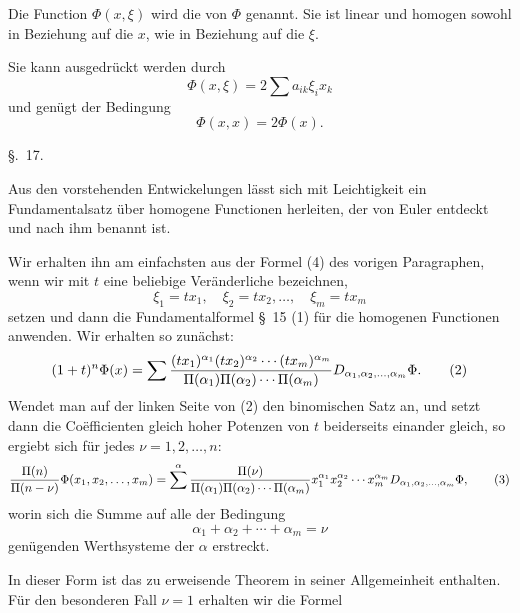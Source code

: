 
Die Function $\Phi(x,\xi)$ wird die  von $\Phi$ genannt. Sie ist linear und homogen sowohl in Beziehung auf die $x$, wie in Beziehung auf die $\xi$.

Sie kann ausgedrückt werden durch
\begin{equation}
 \Phi(x,\xi)=2\sum a_{ik}\xi_i x_k
\tag{14}
\end{equation}
und genügt der Bedingung
\begin{equation}
 \Phi(x,x)=2\Phi(x).
\tag{15}
\end{equation}

\begin{center}
{\large \S.\ 17.}

\vspace{0.5em}
{\large{}}
\end{center}

Aus den vorstehenden Entwickelungen lässt sich mit Leichtigkeit ein Fundamentalsatz über homogene Functionen herleiten, der von Euler entdeckt und nach ihm benannt ist.

Wir erhalten ihn am einfachsten aus der Formel (4) des vorigen Paragraphen, wenn wir mit $t$ eine beliebige Veränderliche bezeichnen,
\begin{equation}
 \xi_1=tx_1,\quad \xi_2=tx_2,\ldots,\quad \xi_m=tx_m
\tag{1}
\end{equation}
setzen und dann die Fundamentalformel \S~15 (1) für die homogenen Functionen anwenden. Wir erhalten so zunächst:
\begin{equation}
 (1+t)^n\Phi(x)
 =
 \sum { (tx_1)^{\alpha_1}(tx_2)^{\alpha_2}\cdots(tx_m)^{\alpha_m}
 \over \Pi(\alpha_1)\Pi(\alpha_2)\cdots\Pi(\alpha_m)}
 D_{\alpha_1,\alpha_2,\ldots,\alpha_m}\Phi.
\tag{2}
\end{equation}
Wendet man auf der linken Seite von (2) den binomischen Satz an, und setzt dann die Coëfficienten gleich hoher Potenzen von $t$ beiderseits einander gleich, so ergiebt sich für jedes $\nu=1,2,\ldots,n$:
\begin{equation}
 {\Pi(n)\over\Pi(n-\nu)}\Phi(x_1,x_2,\ldots,x_m)
 =
 \sum^{\alpha}
 {\Pi(\nu)\over\Pi(\alpha_1)\Pi(\alpha_2)\cdots\Pi(\alpha_m)}
 x_1^{\alpha_1}x_2^{\alpha_2}\cdots x_m^{\alpha_m}
 D_{\alpha_1,\alpha_2,\ldots,\alpha_m}\Phi,
\tag{3}
\end{equation}
worin sich die Summe auf alle der Bedingung
\begin{equation}
 \alpha_1+\alpha_2+\cdots+\alpha_m=\nu
\tag{4}
\end{equation}
genügenden Werthsysteme der $\alpha$ erstreckt.

In dieser Form ist das zu erweisende Theorem in seiner Allgemeinheit enthalten. Für den besonderen Fall $\nu=1$ erhalten wir die Formel
